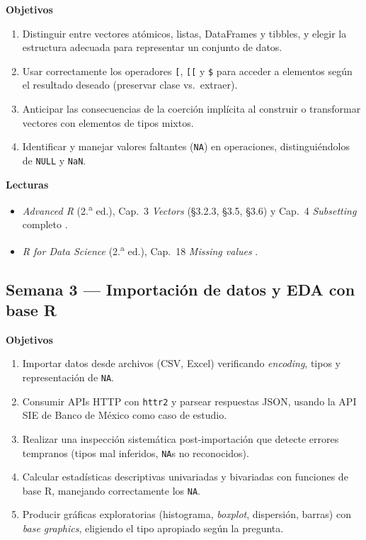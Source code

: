 \documentclass[11pt,letterpaper]{article}
\newcommand{\semanaSucinta}[2]{%
  \subsection*{\color{main}Semana #1 --- #2}%
}
\begin{document}
\noindent\textbf{Objetivos}
\begin{enumerate}[leftmargin=*, itemsep=1pt]
    \item Distinguir entre vectores atómicos, listas, DataFrames y tibbles, y elegir la estructura adecuada para representar un conjunto de datos.
    \item Usar correctamente los operadores \texttt{[}, \texttt{[[} y \texttt{\$} para acceder a elementos según el resultado deseado (preservar clase vs.\ extraer).
    \item Anticipar las consecuencias de la coerción implícita al construir o transformar vectores con elementos de tipos mixtos.
    \item Identificar y manejar valores faltantes (\texttt{NA}) en operaciones, distinguiéndolos de \texttt{NULL} y \texttt{NaN}.
\end{enumerate}

\noindent\textbf{Lecturas}
\begin{itemize}[leftmargin=*, itemsep=1pt]
    \item \textit{Advanced R} (2.\textsuperscript{a} ed.), Cap.\ 3 \textit{Vectors} (§3.2.3, §3.5, §3.6) y Cap.\ 4 \textit{Subsetting} completo \cite{wickham2019advr}.
    \item \textit{R for Data Science} (2.\textsuperscript{a} ed.), Cap.\ 18 \textit{Missing values} \cite{wickham2023r4ds}.
\end{itemize}

\semanaSucinta{3}{Importación de datos y EDA con base R}

\noindent\textbf{Objetivos}
\begin{enumerate}[leftmargin=*, itemsep=1pt]
    \item Importar datos desde archivos (CSV, Excel) verificando \textit{encoding}, tipos y representación de \texttt{NA}.
    \item Consumir APIs HTTP con \texttt{httr2} y parsear respuestas JSON, usando la API SIE de Banco de México como caso de estudio.
    \item Realizar una inspección sistemática post-importación que detecte errores tempranos (tipos mal inferidos, \texttt{NA}s no reconocidos).
    \item Calcular estadísticas descriptivas univariadas y bivariadas con funciones de base R, manejando correctamente los \texttt{NA}.
    \item Producir gráficas exploratorias (histograma, \textit{boxplot}, dispersión, barras) con \textit{base graphics}, eligiendo el tipo apropiado según la pregunta.
\end{enumerate}
\end{document}
